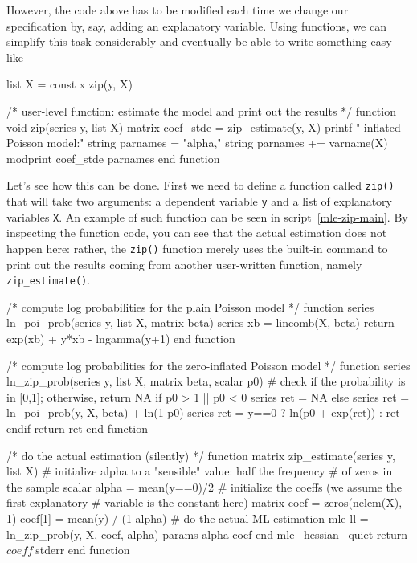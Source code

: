 However, the code above has to be modified each time we change our
specification by, say, adding an explanatory variable.  Using
functions, we can simplify this task considerably and eventually be
able to write something easy like
\begin{code}
list X = const x
zip(y, X)
\end{code}

\begin{script}[htbp]
  \label{mle-zip-main}
\begin{scode}
/*
  user-level function: estimate the model and print out
  the results
*/
function void zip(series y, list X)
    matrix coef_stde = zip_estimate(y, X)
    printf "\nZero-inflated Poisson model:\n"
    string parnames = "alpha,"
    string parnames += varname(X)
    modprint coef_stde parnames
end function
\end{scode}
\end{script}

Let's see how this can be done.  First we need to define a function
called \texttt{zip()} that will take two arguments: a dependent
variable \texttt{y} and a list of explanatory variables \texttt{X}. An
example of such function can be seen in script~\ref{mle-zip-main}. By
inspecting the function code, you can see that the actual estimation
does not happen here: rather, the \texttt{zip()} function merely
uses the built-in  command to print out the results
coming from another user-written function, namely
\texttt{zip\_estimate()}.

\begin{script}[htbp]
  \label{mle-zip-inc}
\begin{scode}
/* compute log probabilities for the plain Poisson model */
function series ln_poi_prob(series y, list X, matrix beta)
    series xb = lincomb(X, beta)
    return -exp(xb) + y*xb - lngamma(y+1)
end function  

/* compute log probabilities for the zero-inflated Poisson model */
function series ln_zip_prob(series y, list X, matrix beta, scalar p0)
    # check if the probability is in [0,1]; otherwise, return NA
    if p0 > 1 || p0 < 0
        series ret = NA
    else
        series ret = ln_poi_prob(y, X, beta) + ln(1-p0)
        series ret = y==0 ? ln(p0 + exp(ret)) : ret
    endif
    return ret
end function  

/* do the actual estimation (silently) */
function matrix zip_estimate(series y, list X)
    # initialize alpha to a "sensible" value: half the frequency
    # of zeros in the sample
    scalar alpha = mean(y==0)/2
    # initialize the coeffs (we assume the first explanatory 
    # variable is the constant here)
    matrix coef = zeros(nelem(X), 1)
    coef[1] = mean(y) / (1-alpha)
    # do the actual ML estimation
    mle ll = ln_zip_prob(y, X, coef, alpha)
        params alpha coef
    end mle --hessian --quiet
    return $coeff ~ $stderr
end function
\end{scode}
\end{script}

